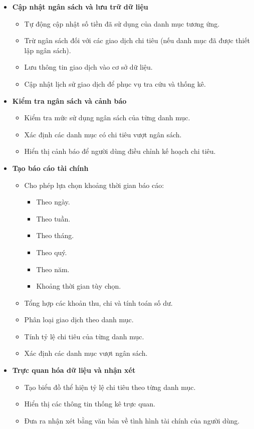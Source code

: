 \documentclass[12pt,letterpaper]{article}
\begin{document}
\begin{itemize}
\item \textbf{Cập nhật ngân sách và lưu trữ dữ liệu}
\begin{itemize}
\item Tự động cập nhật số tiền đã sử dụng của danh mục tương ứng.
\item Trừ ngân sách đối với các giao dịch chi tiêu (nếu danh mục đã được thiết lập ngân sách).
\item Lưu thông tin giao dịch vào cơ sở dữ liệu.
\item Cập nhật lịch sử giao dịch để phục vụ tra cứu và thống kê.
\end{itemize}

\item \textbf{Kiểm tra ngân sách và cảnh báo}
\begin{itemize}
\item Kiểm tra mức sử dụng ngân sách của từng danh mục.
\item Xác định các danh mục có chi tiêu vượt ngân sách.
\item Hiển thị cảnh báo để người dùng điều chỉnh kế hoạch chi tiêu.
\end{itemize}

\item \textbf{Tạo báo cáo tài chính}
\begin{itemize}
\item Cho phép lựa chọn khoảng thời gian báo cáo:
\begin{itemize}
\item Theo ngày.
\item Theo tuần.
\item Theo tháng.
\item Theo quý.
\item Theo năm.
\item Khoảng thời gian tùy chọn.
\end{itemize}
\item Tổng hợp các khoản thu, chi và tính toán số dư.
\item Phân loại giao dịch theo danh mục.
\item Tính tỷ lệ chi tiêu của từng danh mục.
\item Xác định các danh mục vượt ngân sách.

\end{itemize}

\item \textbf{Trực quan hóa dữ liệu và nhận xét}
\begin{itemize}
\item Tạo biểu đồ thể hiện tỷ lệ chi tiêu theo từng danh mục.
\item Hiển thị các thông tin thống kê trực quan.
\item Đưa ra nhận xét bằng văn bản về tình hình tài chính của người dùng.
\end{itemize}


\end{itemize}
\end{document}
